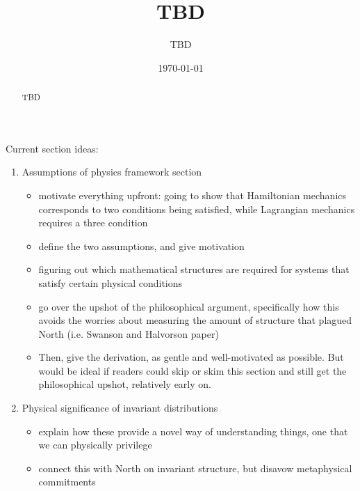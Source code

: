 \documentclass[letterpaper]{article}
\begin{document}

\title{TBD}
\author{TBD}

\date{\today}

\maketitle

\begin{abstract}
	TBD
\end{abstract}


Current section ideas:

\begin{enumerate}[1.)]

\item Assumptions of physics framework section

\begin{itemize}

\item motivate everything upfront: going to show that Hamiltonian mechanics corresponds to two conditions being satisfied, while Lagrangian mechanics requires a three condition
\item define the two assumptions, and give motivation
\item figuring out which mathematical structures are required for systems that satisfy certain physical conditions
\item go over the upshot of the philosophical argument, specifically how this avoids the worries about measuring the amount of structure that plagued North (i.e. Swanson and Halvorson paper)
\item Then, give the derivation, as gentle and well-motivated as possible. But would be ideal if readers could skip or skim this section and still get the philosophical upshot, relatively early on.

\end{itemize}

\item Physical significance of invariant distributions

\begin{itemize}

\item explain how these provide a novel way of understanding things, one that we can physically privilege

\item connect this with North on invariant structure, but disavow metaphysical commitments



\end{itemize}
\end{enumerate}
\end{document}
